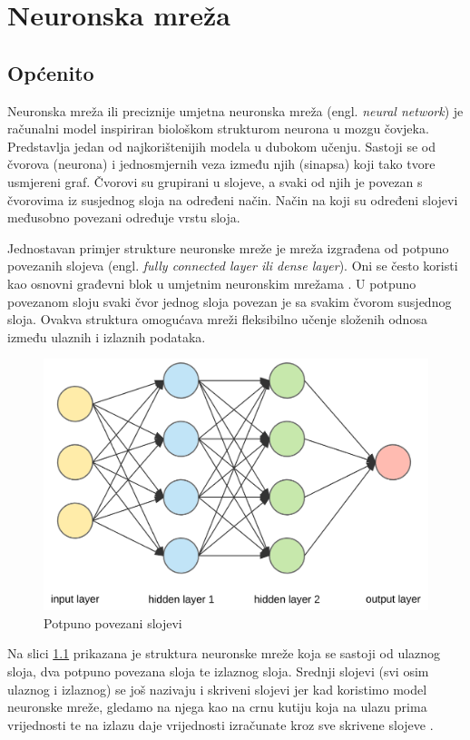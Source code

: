 \chapter{Neuronska mreža}
\label{pog:neuronska_mreza}

\section{Općenito}

Neuronska mreža ili preciznije umjetna neuronska mreža (engl. \textit{neural network}) je računalni model inspiriran
biološkom strukturom neurona u mozgu čovjeka. Predstavlja jedan od najkorištenijih modela 
u dubokom učenju. Sastoji se od čvorova (neurona) i jednosmjernih
veza između njih (sinapsa) koji tako tvore usmjereni graf. Čvorovi su grupirani u slojeve,
a svaki od njih je povezan s čvorovima iz susjednog sloja na određeni način. Način na koji su
određeni slojevi međusobno povezani određuje vrstu sloja. 

Jednostavan primjer strukture neuronske mreže je mreža izgrađena od potpuno povezanih slojeva 
(engl. \textit{fully connected layer ili dense layer}). Oni se često koristi kao osnovni građevni blok u 
umjetnim neuronskim mrežama \cite{dense}.
U potpuno povezanom sloju svaki čvor jednog sloja povezan je sa svakim čvorom susjednog sloja.
Ovakva struktura omogućava mreži fleksibilno učenje složenih odnosa između ulaznih i izlaznih podataka.

\begin{figure}[htb]
  \centering
  \includegraphics[width=0.5\linewidth]{Chapters/neuronska_mreza/dense_layer.png} 
  \caption{Potpuno povezani slojevi \cite{dense}}
  \label{pic:dense_layer}
\end{figure}

Na slici \ref{pic:dense_layer} prikazana je struktura neuronske mreže koja se sastoji od ulaznog sloja,
dva potpuno povezana sloja te izlaznog sloja. Srednji slojevi (svi osim ulaznog i izlaznog)
se još nazivaju i skriveni slojevi jer kad koristimo model neuronske mreže, gledamo
na njega kao na crnu kutiju koja na ulazu prima vrijednosti te na izlazu daje vrijednosti
izračunate kroz sve skrivene slojeve \cite{fully_connected}.

